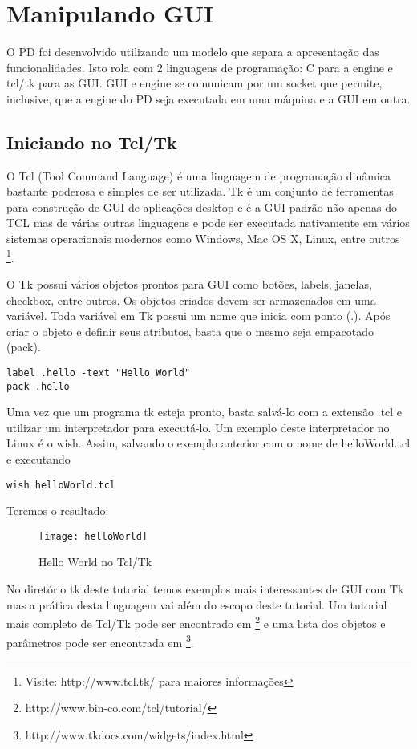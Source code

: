 \chapter{Manipulando GUI}

O PD foi desenvolvido utilizando um modelo que separa a apresentação das
funcionalidades.
Isto rola com 2 linguagens de programação: C para a engine e tcl/tk para as GUI.
GUI e engine se comunicam por um socket que permite, inclusive, que a engine
do PD seja executada em uma máquina e a GUI em outra.


\section{Iniciando no Tcl/Tk}
O Tcl (Tool Command Language) é uma linguagem de programação dinâmica bastante poderosa e simples de ser utilizada. 
Tk é um conjunto de ferramentas para construção de GUI de aplicações desktop e é a GUI padrão não apenas do TCL mas 
de várias outras linguagens e pode ser executada nativamente em vários sistemas operacionais modernos como Windows,
 Mac OS X, Linux, entre outros \footnote{Visite: http://www.tcl.tk/ para maiores informações}.

O Tk possui vários objetos prontos para GUI como botões, labels, janelas, checkbox, entre outros. Os objetos criados
devem ser armazenados em uma variável. Toda variável em Tk possui um nome que inicia com ponto (.). Após criar o objeto
e definir seus atributos, basta que o mesmo seja empacotado (pack).

\begin{lstlisting}
label .hello -text "Hello World"
pack .hello
\end{lstlisting}

Uma vez que um programa tk esteja pronto, basta salvá-lo com a extensão .tcl e utilizar um interpretador para executá-lo.
Um exemplo deste interpretador no Linux é o wish. Assim, salvando o exemplo anterior com o nome de helloWorld.tcl e executando

\begin{lstlisting}
wish helloWorld.tcl
\end{lstlisting}

Teremos o resultado:
\begin{figure}[ht!]
	\centering
	\texttt{[image: helloWorld]}
	\caption{Hello World no Tcl/Tk}
\end{figure}

No diretório tk deste tutorial temos exemplos mais interessantes de GUI com Tk mas a prática desta linguagem
vai além do escopo deste tutorial. Um tutorial mais completo de Tcl/Tk pode ser encontrado em 
\footnote{http://www.bin-co.com/tcl/tutorial/} e uma lista dos objetos e parâmetros pode ser encontrada em
\footnote{http://www.tkdocs.com/widgets/index.html}.


